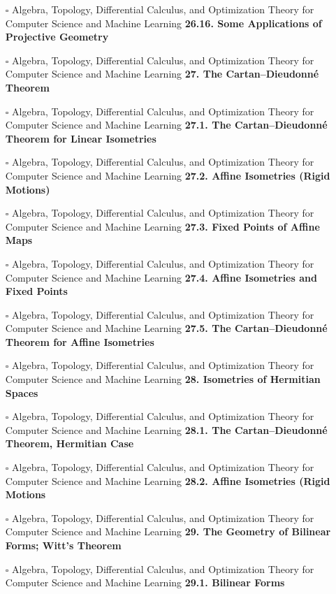 \documentclass[a4, landscape, 12pt]{article}
\newcommand{\checkbox}{$\square$}%
\begin{document}
\begin{itemize}
{}
\item [\checkbox]  Algebra, Topology, Differential Calculus, and Optimization Theory for Computer Science and Machine Learning \textbf{ 26.16. Some Applications of Projective Geometry
}
\item [\checkbox]  Algebra, Topology, Differential Calculus, and Optimization Theory for Computer Science and Machine Learning \textbf{ 27. The Cartan–Dieudonné Theorem
}
\item [\checkbox]  Algebra, Topology, Differential Calculus, and Optimization Theory for Computer Science and Machine Learning \textbf{ 27.1. The Cartan–Dieudonné Theorem for Linear Isometries
}
\item [\checkbox]  Algebra, Topology, Differential Calculus, and Optimization Theory for Computer Science and Machine Learning \textbf{ 27.2. Affine Isometries (Rigid Motions)
}
\item [\checkbox]  Algebra, Topology, Differential Calculus, and Optimization Theory for Computer Science and Machine Learning \textbf{ 27.3. Fixed Points of Affine Maps
}
\item [\checkbox]  Algebra, Topology, Differential Calculus, and Optimization Theory for Computer Science and Machine Learning \textbf{ 27.4. Affine Isometries and Fixed Points
}
\item [\checkbox]  Algebra, Topology, Differential Calculus, and Optimization Theory for Computer Science and Machine Learning \textbf{ 27.5. The Cartan–Dieudonné Theorem for Affine Isometries
}
\item [\checkbox]  Algebra, Topology, Differential Calculus, and Optimization Theory for Computer Science and Machine Learning \textbf{ 28. Isometries of Hermitian Spaces
}
\item [\checkbox]  Algebra, Topology, Differential Calculus, and Optimization Theory for Computer Science and Machine Learning \textbf{ 28.1. The Cartan–Dieudonné Theorem, Hermitian Case
}
\item [\checkbox]  Algebra, Topology, Differential Calculus, and Optimization Theory for Computer Science and Machine Learning \textbf{ 28.2. Affine Isometries (Rigid Motions
}
\item [\checkbox]  Algebra, Topology, Differential Calculus, and Optimization Theory for Computer Science and Machine Learning \textbf{ 29. The Geometry of Bilinear Forms; Witt’s Theorem
}
\item [\checkbox]  Algebra, Topology, Differential Calculus, and Optimization Theory for Computer Science and Machine Learning \textbf{ 29.1. Bilinear Forms
}
\end{itemize}
\end{document}

